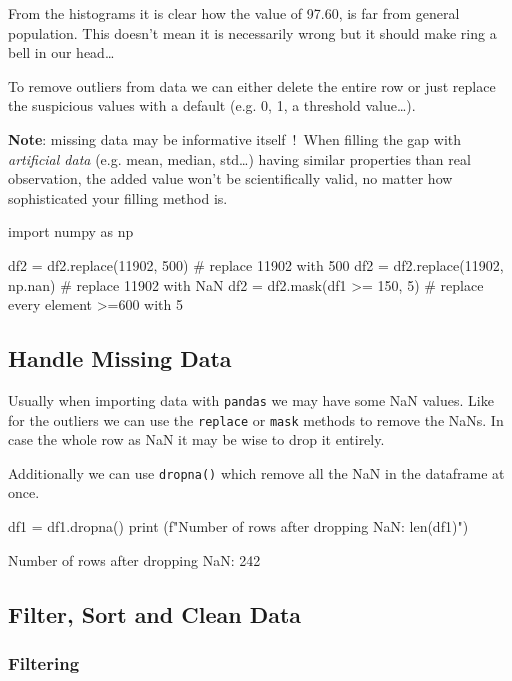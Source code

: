 From the histograms it is clear how the value of 97.60, is far from general population. This doesn't mean it is necessarily wrong but it should make ring a bell in our head\ldots

To remove outliers from data we can either delete the entire row or just replace the suspicious values with a default (e.g. 0, 1, a threshold value\ldots).

\textbf{Note}: missing data may be informative itself~!~When filling the gap with \emph{artificial data} (e.g. mean, median, std\ldots) having similar properties than real observation, the added value won't be scientifically valid, no matter how sophisticated your filling method is.

\begin{ipythonnon}
import numpy as np

df2 = df2.replace(11902, 500) # replace 11902 with 500
df2 = df2.replace(11902, np.nan) # replace 11902 with NaN
df2 = df2.mask(df1 >= 150, 5) # replace every element >=600 with 5
\end{ipythonnon}

\subsection{Handle Missing Data}\label{handle-missing-data}

Usually when importing data with \texttt{pandas} we may have some NaN values. Like for the outliers we can use the \texttt{replace} or \texttt{mask} methods to remove the NaNs. In case the whole row as NaN it may be wise to drop it entirely.

Additionally we can use \texttt{dropna()} which remove all the NaN in the dataframe at once.

\begin{ipythonnon}
df1 = df1.dropna()
print (f"Number of rows after dropping NaN: {len(df1)}")
\end{ipythonnon}
\begin{ioutput}
Number of rows after dropping NaN: 242
\end{ioutput}

\subsection{Filter, Sort and Clean Data}
\label{filter-sort-and-clean-data}

\subsubsection{Filtering}\label{filtering}

